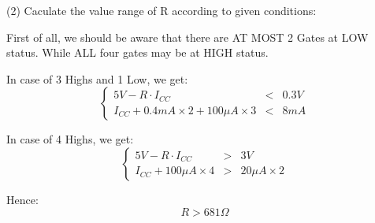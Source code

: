     (2) Caculate the value range of R according to given conditions:
    
    {\color{hwSolution}
        First of all, we should be aware that there are AT MOST 2 Gates at LOW status. While ALL four gates may be at HIGH status.

        In case of 3 Highs and 1 Low, we get:
        \begin{equation*}
            \left\{\begin{array}{lcl}
                5V - R\cdot I_{CC} &<& 0.3V \\
                I_{CC} + 0.4mA \times 2 + 100\mu A \times 3 &<& 8 mA
            \end{array}
            \right.
        \end{equation*}

        In case of 4 Highs, we get:
        \begin{equation*}
            \left\{\begin{array}{lcl}
                5V - R\cdot I_{CC} &>& 3V \\
                I_{CC} + 100\mu A \times 4 &>& 20\mu A \times 2
            \end{array}
            \right.
        \end{equation*}

        Hence:
        \[
            R > 681\Omega
        \]
    }
